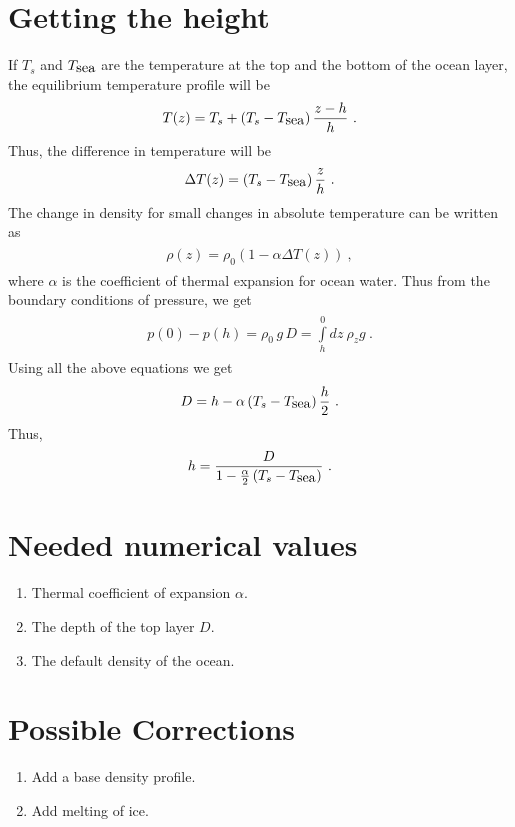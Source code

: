 \documentclass[fontsize = 13pt]{scrartcl}
\begin{document}
\section{Getting the height}
If \(T_s\) and \(T_{\mbox{sea}}\) are the temperature at the top and the bottom of the ocean layer, the equilibrium temperature profile will be
\begin{align}
\begin{split}
    T(z) = T_s + \left( T_s - T_{\mbox{sea}} \right)\frac{z -h}{h} \ .
\end{split}
\end{align}
Thus, the difference in temperature will be 
\begin{align}
\begin{split}
    \Delta T (z) = \left( T_s - T_{\mbox{sea}} \right)\frac{z}{h} \ .
\end{split}
\end{align}
The change in density for small changes in absolute temperature can be written as
\begin{align}
\begin{split}
    \rho(z) = \rho_0 \left( 1 -\alpha \Delta T(z) \right) \ ,
\end{split}
\end{align}
where \(\alpha\) is the coefficient of thermal expansion for ocean water. Thus from the boundary conditions of pressure, we get
\begin{align}
\begin{split}
    p(0) - p(h) =    \rho_0\,g\,D  = \int\limits_{h}^{0} dz\  \rho_z g  \ . 
\end{split}
\end{align}
Using all the above equations we get
\begin{align}
\begin{split}
    D = h - \alpha \left( T_s - T_{\mbox{sea}} \right)\frac{h}{2} \ .
\end{split}
\end{align}
Thus, 
\begin{align}
\begin{split}
    h = \frac{D}{1 - \frac{\alpha}{2} \left( T_s{} - T_{\mbox{sea}} \right)} \ .
\end{split}
\end{align}

\section{Needed numerical values}
\begin{enumerate}
    \item Thermal coefficient of expansion \(\alpha\).
    \item The depth of the top layer \(D\).
    \item The default density of the ocean.
\end{enumerate}
\section{Possible Corrections}
\begin{enumerate}
    \item Add a base density profile.
    \item Add melting of ice.
\end{enumerate}
\end{document}
